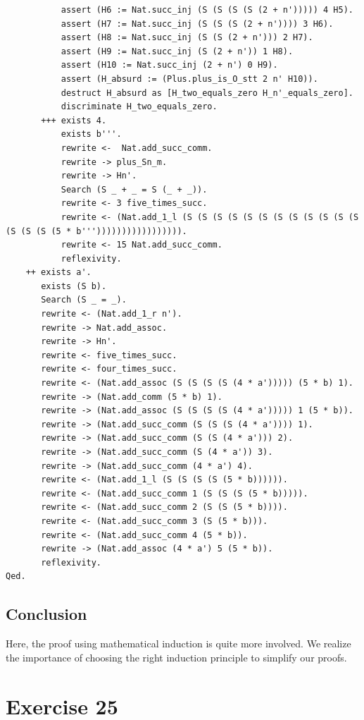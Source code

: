 \documentclass{article}
\begin{document}
\begin{lstlisting}
           assert (H6 := Nat.succ_inj (S (S (S (S (2 + n'))))) 4 H5).
           assert (H7 := Nat.succ_inj (S (S (S (2 + n')))) 3 H6).
           assert (H8 := Nat.succ_inj (S (S (2 + n'))) 2 H7).
           assert (H9 := Nat.succ_inj (S (2 + n')) 1 H8).
           assert (H10 := Nat.succ_inj (2 + n') 0 H9).
           assert (H_absurd := (Plus.plus_is_O_stt 2 n' H10)).
           destruct H_absurd as [H_two_equals_zero H_n'_equals_zero].
           discriminate H_two_equals_zero.
       +++ exists 4.
           exists b'''.
           rewrite <-  Nat.add_succ_comm.
           rewrite -> plus_Sn_m.
           rewrite -> Hn'.
           Search (S _ + _ = S (_ + _)).
           rewrite <- 3 five_times_succ.
           rewrite <- (Nat.add_1_l (S (S (S (S (S (S (S (S (S (S (S (S (S (S (S (5 * b'''))))))))))))))))).
           rewrite <- 15 Nat.add_succ_comm.
           reflexivity.
    ++ exists a'.
       exists (S b).
       Search (S _ = _).
       rewrite <- (Nat.add_1_r n').
       rewrite -> Nat.add_assoc.
       rewrite -> Hn'.
       rewrite <- five_times_succ.
       rewrite <- four_times_succ.
       rewrite <- (Nat.add_assoc (S (S (S (S (4 * a'))))) (5 * b) 1).
       rewrite -> (Nat.add_comm (5 * b) 1).
       rewrite -> (Nat.add_assoc (S (S (S (S (4 * a'))))) 1 (5 * b)).
       rewrite -> (Nat.add_succ_comm (S (S (S (4 * a')))) 1).
       rewrite -> (Nat.add_succ_comm (S (S (4 * a'))) 2).
       rewrite -> (Nat.add_succ_comm (S (4 * a')) 3).
       rewrite -> (Nat.add_succ_comm (4 * a') 4).
       rewrite <- (Nat.add_1_l (S (S (S (S (5 * b)))))).
       rewrite <- (Nat.add_succ_comm 1 (S (S (S (5 * b))))).
       rewrite <- (Nat.add_succ_comm 2 (S (S (5 * b)))).
       rewrite <- (Nat.add_succ_comm 3 (S (5 * b))).
       rewrite <- (Nat.add_succ_comm 4 (5 * b)).
       rewrite -> (Nat.add_assoc (4 * a') 5 (5 * b)).
       reflexivity.
Qed.
\end{lstlisting}

\subsection{Conclusion}

Here, the proof using mathematical induction is quite more involved. We realize the importance of choosing the right induction principle to simplify our proofs.

\newpage

\section{Exercise 25}
\end{document}
